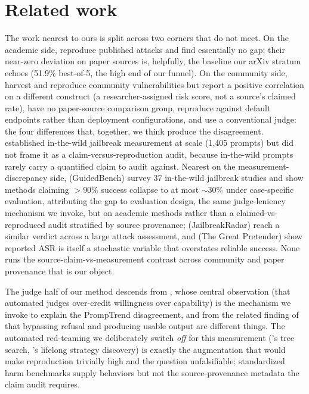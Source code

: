 \documentclass[letterpaper,twocolumn,10pt]{article}
\begin{document}
\section{Related work}

The work nearest to ours is split across two corners that do not meet. On the academic side, \citet{fang2026jailbreakfoundry} reproduce published attacks and find essentially no gap; their near-zero deviation on paper sources is, helpfully, the baseline our arXiv stratum echoes (51.9\% best-of-5, the high end of our funnel). On the community side, \citet{gasmi2025promptrend} harvest and reproduce community vulnerabilities but report a positive correlation on a different construct (a researcher-assigned risk score, not a source's claimed rate), have no paper-source comparison group, reproduce against default endpoints rather than deployment configurations, and use a conventional judge: the four differences that, together, we think produce the disagreement. \citet{shen2024doanythingnow} established in-the-wild jailbreak measurement at scale (1{,}405 prompts) but did not frame it as a claim-versus-reproduction audit, because in-the-wild prompts rarely carry a quantified claim to audit against. Nearest on the measurement-discrepancy side, \citet{huang2025guidedbench} (GuidedBench) survey 37 in-the-wild jailbreak studies and show methods claiming $>$90\% success collapse to at most $\sim$30\% under case-specific evaluation, attributing the gap to evaluation design, the same judge-leniency mechanism we invoke, but on academic methods rather than a claimed-vs-reproduced audit stratified by source provenance; \citet{chu2025jailbreakradar} (JailbreakRadar) reach a similar verdict across a large attack assessment, and \citet{monteuuis2026pretender} (The Great Pretender) show reported ASR is itself a stochastic variable that overstates reliable success. None runs the source-claim-vs-measurement contrast across community and paper provenance that is our object.

The judge half of our method descends from \citet{souly2024strongreject}, whose central observation (that automated judges over-credit willingness over capability) is the mechanism we invoke to explain the PrompTrend disagreement, and from the related finding of \citet{nikolic2025jailbreaktax} that bypassing refusal and producing usable output are different things. The automated red-teaming we deliberately switch \emph{off} for this measurement (\citet{mehrotra2024treeofattacks}'s tree search, \citet{liu2025autodanturbo}'s lifelong strategy discovery) is exactly the augmentation that would make reproduction trivially high and the question unfalsifiable; standardized harm benchmarks \citep{mazeika2024harmbench, zou2023universal} supply behaviors but not the source-provenance metadata the claim audit requires.
\end{document}
